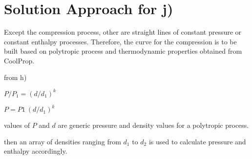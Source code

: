 \documentclass[letterpaper,10pt,english]{jupyterBook}
\begin{document}
\section{Solution Approach for j)}
\label{\detokenize{notebooks/Chapter5/CH5-Q5:solution-approach-for-j}}
\sphinxAtStartPar
Except the compression process, other are straight lines of constant pressure or constant enthalpy processes. Therefore, the curve for the compression is to be built based on polytropic process and thermodynamic properties obtained from CoolProp.

\sphinxAtStartPar
from h)

\sphinxAtStartPar
\(P/P_1=(d/d_1)^k\)

\sphinxAtStartPar
\(P=P1\:(d/d_1)^k\)

\sphinxAtStartPar
values of \(P\) and \(d\) are generic pressure and density values for a polytropic process.

\sphinxAtStartPar
then an array of densities ranging from \(d_1\) to \(d_2\) is used to calculate pressure and enthalpy accordingly.
\end{document}
